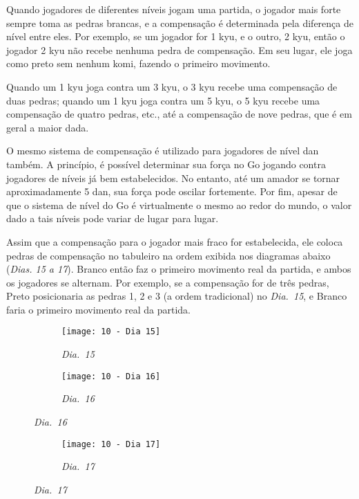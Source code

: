 Quando jogadores de diferentes níveis jogam uma partida, o jogador mais forte sempre toma as pedras brancas, e a compensação é determinada pela diferença de nível entre eles. Por exemplo, se um jogador for 1 kyu, e o outro, 2 kyu, então o jogador 2 kyu não recebe nenhuma pedra de compensação. Em seu lugar, ele joga como preto sem nenhum komi, fazendo o primeiro movimento.

Quando um 1 kyu joga contra um 3 kyu, o 3 kyu recebe uma compensação de duas pedras; quando um 1 kyu joga contra um 5 kyu, o 5 kyu recebe uma compensação de quatro pedras, etc., até a compensação de nove pedras, que é em geral a maior dada.

O mesmo sistema de compensação é utilizado para jogadores de nível dan também. A princípio, é possível determinar sua força no Go jogando contra jogadores de níveis já bem estabelecidos. No entanto, até um amador se tornar aproximadamente 5 dan, sua força pode oscilar fortemente. Por fim, apesar de que o sistema de nível do Go é virtualmente o mesmo ao redor do mundo, o valor dado a tais níveis pode variar de lugar para lugar.

Assim que a compensação para o jogador mais fraco for estabelecida, ele coloca pedras de compensação no tabuleiro na ordem exibida nos diagramas abaixo (\emph{Dias. 15 a 17}). Branco então faz o primeiro movimento real da partida, e ambos os jogadores se alternam. Por exemplo, se a compensação for de três pedras, Preto posicionaria as pedras 1, 2 e 3 (a ordem tradicional) no \emph{Dia.\@~15}, e Branco faria o primeiro movimento real da partida.

\begin{figure}[h!]
    \centering
    \begin{subfigure}[t]{.45\textwidth}
        \texttt{[image: 10 - Dia 15]}
        \caption*{\emph{Dia.\@~15}}
    \end{subfigure}
    \hspace{1cm}
    \begin{subfigure}[t]{.45\textwidth}
        \texttt{[image: 10 - Dia 16]}
        \caption*{\emph{Dia.\@~16}}
    \end{subfigure}
\end{figure}

\begin{figure}[h!]
    \centering
    \begin{subfigure}[t]{.45\textwidth}
        \texttt{[image: 10 - Dia 17]}
        \caption*{\emph{Dia.\@~17}}
    \end{subfigure}
\end{figure}

